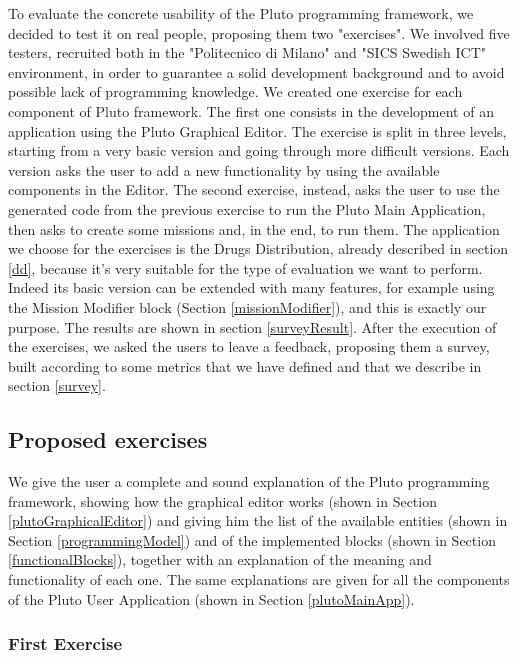 To evaluate the concrete usability of the Pluto programming framework, we decided to test it on real people, proposing them two "exercises".
We involved five testers, recruited both in the "Politecnico di Milano" and "SICS Swedish ICT" environment, in order to guarantee a solid development background and to avoid possible lack of programming knowledge.
We created one exercise for each component of Pluto framework.
The first one consists in the development of an application using the Pluto Graphical Editor.
The exercise is split in three levels, starting from a very basic version and going through more difficult versions. Each version asks the user to add a new functionality by using the available components in the Editor.
The second exercise, instead, asks the user to use the generated code from the previous exercise to run the Pluto Main Application, then asks to create some missions and, in the end, to run them.
The application we choose for the exercises is the Drugs Distribution, already described in section \ref{dd}, because it's very suitable for the type of evaluation we want to perform.
Indeed its basic version can be extended with many features, for example using the Mission Modifier block (Section \ref{missionModifier}), and this is exactly our purpose.
The results are shown in section \ref{surveyResult}.
After the execution of the exercises, we asked the users to leave a feedback, proposing them a survey, built according to some metrics that we have defined and that we describe in section \ref{survey}.

\subsection{Proposed exercises}
\label{exercise}

We give the user a complete and sound explanation of the Pluto programming framework, showing how the graphical editor works (shown in Section \ref{plutoGraphicalEditor}) and giving him the list of the available entities (shown in Section \ref{programmingModel}) and of the implemented blocks (shown in Section \ref{functionalBlocks}), together with an explanation of the meaning and functionality of each one.
The same explanations are given for all the components of the Pluto User Application (shown in Section \ref{plutoMainApp}).

\subsubsection{First Exercise}

